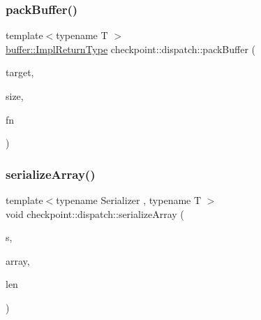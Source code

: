 \mbox{\label{namespacecheckpoint_1_1dispatch_aca3c0f09e49b43fb6f3d82fe39e89295}} 
\subsubsection{\texorpdfstring{pack\+Buffer()}{packBuffer()}}
{\footnotesize\ttfamily template$<$typename T $>$ \\
\hyperlink{namespacecheckpoint_1_1buffer_a4e930737a23dabd17333a8ea48c8edff}{buffer\+::\+Impl\+Return\+Type} checkpoint\+::dispatch\+::pack\+Buffer (\begin{DoxyParamCaption}\item[{T \&}]{target,  }\item[{\hyperlink{namespacecheckpoint_a083f6674da3f94c2901b18c6d238217c}{Serial\+Size\+Type}}]{size,  }\item[{\hyperlink{namespacecheckpoint_a8a2558a1dd0db386339dd81c193b7f10}{Buffer\+Obtain\+Fn\+Type}}]{fn }\end{DoxyParamCaption})}

\mbox{\label{namespacecheckpoint_1_1dispatch_a055fa8c0078dbd129325b1038079d87d}} 
\subsubsection{\texorpdfstring{serialize\+Array()}{serializeArray()}}
{\footnotesize\ttfamily template$<$typename Serializer , typename T $>$ \\
void checkpoint\+::dispatch\+::serialize\+Array (\begin{DoxyParamCaption}\item[{\hyperlink{structcheckpoint_1_1_serializer}{Serializer} \&}]{s,  }\item[{T $\ast$}]{array,  }\item[{\hyperlink{namespacecheckpoint_a083f6674da3f94c2901b18c6d238217c}{Serial\+Size\+Type} const}]{len }\end{DoxyParamCaption})\hspace{0.3cm}{\ttfamily [inline]}}

